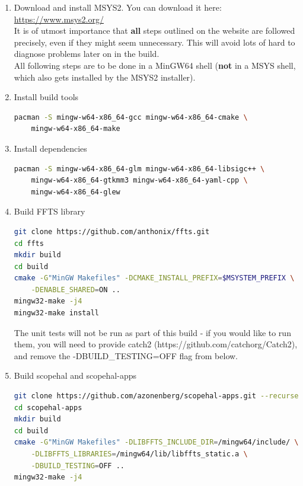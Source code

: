 \begin{enumerate}

\item Download and install MSYS2. You can download it here: \url{https://www.msys2.org/}\\
It is of utmost importance that \textbf{all} steps outlined on the website are followed precisely, even if they might seem unnecessary. This will avoid lots of hard to diagnose problems later on in the build.\\

All following steps are to be done in a MinGW64 shell (\textbf{not} in a MSYS shell, which also gets installed by the MSYS2 installer).

\item Install build tools
\begin{lstlisting}[language=sh]
pacman -S mingw-w64-x86_64-gcc mingw-w64-x86_64-cmake \
    mingw-w64-x86_64-make
\end{lstlisting}

\item Install dependencies
\begin{lstlisting}[language=sh]
pacman -S mingw-w64-x86_64-glm mingw-w64-x86_64-libsigc++ \
    mingw-w64-x86_64-gtkmm3 mingw-w64-x86_64-yaml-cpp \
    mingw-w64-x86_64-glew
\end{lstlisting}

\item Build FFTS library
\begin{lstlisting}[language=sh]
git clone https://github.com/anthonix/ffts.git
cd ffts
mkdir build
cd build
cmake -G"MinGW Makefiles" -DCMAKE_INSTALL_PREFIX=$MSYSTEM_PREFIX \
    -DENABLE_SHARED=ON ..
mingw32-make -j4
mingw32-make install
\end{lstlisting}

The unit tests will not be run as part of this build - if you would like to run them, you will need to provide catch2 (https://github.com/catchorg/Catch2), and remove the -DBUILD\_TESTING=OFF flag from below.

\item Build scopehal and scopehal-apps
\begin{lstlisting}[language=sh]
git clone https://github.com/azonenberg/scopehal-apps.git --recurse-submodules
cd scopehal-apps
mkdir build
cd build
cmake -G"MinGW Makefiles" -DLIBFFTS_INCLUDE_DIR=/mingw64/include/ \
    -DLIBFFTS_LIBRARIES=/mingw64/lib/libffts_static.a \
    -DBUILD_TESTING=OFF ..
mingw32-make -j4
\end{lstlisting}


\end{enumerate}
